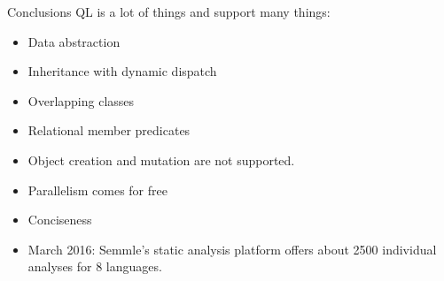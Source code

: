 \documentclass[usenames,dvipsnames]{beamer}
\begin{document}
\begin{frame}{Conclusions}
QL is a lot of things and support many things:
\begin{itemize}
\item Data abstraction
\item Inheritance with dynamic dispatch
\item Overlapping classes
\item Relational member predicates
\item Object creation and mutation are not supported.
\item Parallelism comes for free
\item Conciseness
\item March 2016: Semmle's static analysis platform offers about 2500 individual analyses for 8 languages.
\end{itemize}


\end{frame}

%
%
\end{document}
